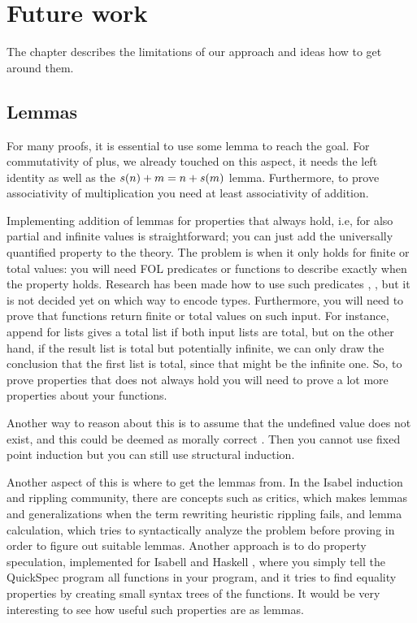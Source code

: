 \chapter{Future work}
\label{ch:future}

The chapter describes the limitations of our approach and ideas how to
get around them.

\section{Lemmas}

For many proofs, it is essential to use some lemma to reach the
goal. For commutativity of plus, we already touched on this aspect, it
needs the left identity as well as the $s(n) + m = n + s(m)$
lemma. Furthermore, to prove associativity of multiplication you need
at least associativity of addition.

Implementing addition of lemmas for properties that always hold, i.e,
for also partial and infinite values is straightforward; you can just
add the universally quantified property to the theory. The problem is
when it only holds for finite or total values: you will need FOL
predicates or functions to describe exactly when the property
holds. Research has been made how to use such predicates
\cite{sortMonotonicity}, \cite{polyMonotonicity}, but it is not
decided yet on which way to encode types. Furthermore, you will need
to prove that functions return finite or total values on such
input. For instance, append for lists gives a total list if both input
lists are total, but on the other hand, if the result list is total
but potentially infinite, we can only draw the conclusion that the
first list is total, since that might be the infinite one. So, to
prove properties that does not always hold you will need to prove a
lot more properties about your functions.

Another way to reason about this is to assume that the undefined value
does not exist, and this could be deemed as morally correct
\cite{fastandloose}. Then you cannot use fixed point induction but you
can still use structural induction.

Another aspect of this is where to get the lemmas from. In the Isabel
induction and rippling community, there are concepts such as critics,
which makes lemmas and generalizations when the term rewriting
heuristic rippling fails, and lemma calculation, which tries to
syntactically analyze the problem before proving in order to figure
out suitable lemmas. Another approach is to do property speculation,
implemented for Isabell \cite{isacosy} and Haskell \cite{quickspec},
where you simply tell the QuickSpec program all functions in your
program, and it tries to find equality properties by creating small syntax
trees of the functions. It would be very interesting to see how useful
such properties are as lemmas.

